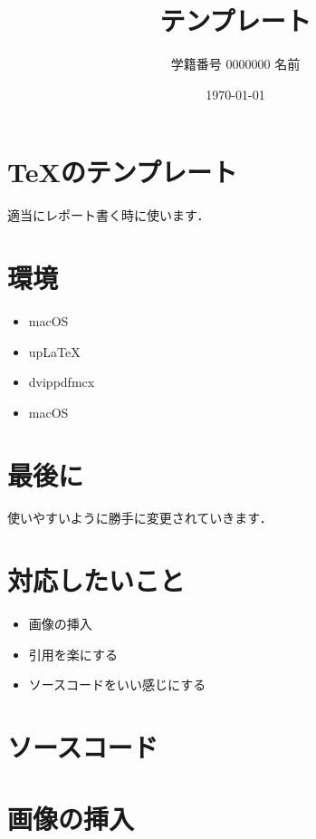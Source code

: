 \documentclass{ujarticle}
\title{テンプレート}
\author{学籍番号 0000000 名前}
\date{\today}
\begin{document}
\maketitle

\section{TeXのテンプレート}
適当にレポート書く時に使います．

\section{環境}
\begin{itemize}
    \item macOS
    \item upLaTeX
    \item dvippdfmcx
    \item macOS
\end{itemize}

\section{最後に}
使いやすいように勝手に変更されていきます．

\section{対応したいこと}
\begin{itemize}
    \item 画像の挿入
    \item 引用を楽にする
    \item ソースコードをいい感じにする
\end{itemize}

\section{ソースコード}


\section{画像の挿入}

\end{document}
